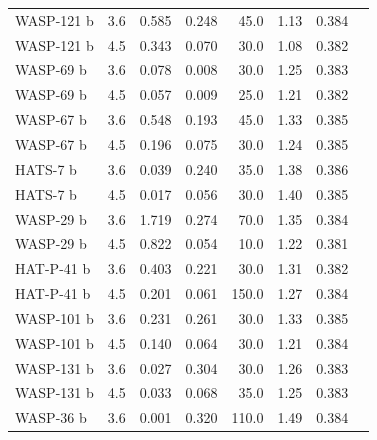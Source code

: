 \begin{subappendices}
{\begin{landscape}
\begin{longtable}[h]{llrrrrrr}
  WASP-121 b  &               3.6 &           0.585 &      0.248 &     45.0 &          1.13 &                0.384 \\
  WASP-121 b  &               4.5 &           0.343 &      0.070 &     30.0 &          1.08 &                0.382 \\
  WASP-69 b   &               3.6 &           0.078 &      0.008 &     30.0 &          1.25 &                0.383 \\
  WASP-69 b   &               4.5 &           0.057 &      0.009 &     25.0 &          1.21 &                0.382 \\
  WASP-67 b   &               3.6 &           0.548 &      0.193 &     45.0 &          1.33 &                0.385 \\
  WASP-67 b   &               4.5 &           0.196 &      0.075 &     30.0 &          1.24 &                0.385 \\
  HATS-7 b    &               3.6 &           0.039 &      0.240 &     35.0 &          1.38 &                0.386 \\
  HATS-7 b    &               4.5 &           0.017 &      0.056 &     30.0 &          1.40 &                0.385 \\
  WASP-29 b   &               3.6 &           1.719 &      0.274 &     70.0 &          1.35 &                0.384 \\
  WASP-29 b   &               4.5 &           0.822 &      0.054 &     10.0 &          1.22 &                0.381 \\
  HAT-P-41 b   &               3.6 &           0.403 &      0.221 &     30.0 &          1.31 &                0.382 \\
  HAT-P-41 b   &               4.5 &           0.201 &      0.061 &    150.0 &          1.27 &                0.384 \\
  WASP-101 b  &               3.6 &           0.231 &      0.261 &     30.0 &          1.33 &                0.385 \\
  WASP-101 b  &               4.5 &           0.140 &      0.064 &     30.0 &          1.21 &                0.384 \\
  WASP-131 b  &               3.6 &           0.027 &      0.304 &     30.0 &          1.26 &                0.383 \\
  WASP-131 b  &               4.5 &           0.033 &      0.068 &     35.0 &          1.25 &                0.383 \\
  WASP-36 b   &               3.6 &           0.001 &      0.320 &    110.0 &          1.49 &                0.384 \\

\end{longtable}
\end{landscape}}
\end{subappendices}

